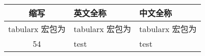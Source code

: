 \cleardoublepage
{}
\begin{table}[htbp]
    \centering
    \fontsize{10}{6}
    \begin{tabularx}{\linewidth}{cX<{\centering}X<{\centering}}
        \toprule \textbf{缩写}&\textbf{英文全称}&\textbf{中文全称}\\
        \midrule tabularx 宏包为&tabularx 宏包为&tabularx 宏包为\\
        {\color{red} 54}&test&test\\
        \bottomrule
    \end{tabularx}

\end{table}

